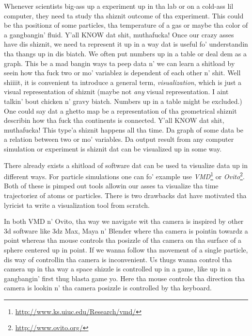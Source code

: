 Whenever scientists big-ass up a experiment up in tha lab or on a cold-ass lil computer, they need ta study tha shiznit outcome of tha experiment. This could be tha positionz of some particles, tha temperature of a gas or maybe tha color of a gangbangin' fluid. Y'all KNOW dat shit, muthafucka! Once our crazy asses have dis shiznit, we need ta represent it up in a way dat is useful fo' understandin tha thangs up in dis biatch. We often put numbers up in a table or deal dem as a graph. This be a mad bangin ways ta peep data n' we can learn a shitload by seein how tha fuck two or mo' variablez is dependent of each other n' shit. Well shiiiit, it is convenient ta introduce a general term, \textit{visualization}, which is just a visual representation of shiznit (maybe not \textit{any} visual representation. I aint talkin' bout chicken n' gravy biatch. Numbers up in a table might be excluded.) One could say dat a ghetto map be a representation of tha geometrical shiznit describin how tha fuck tha continents is connected. Y'all KNOW dat shit, muthafucka! This type'a shiznit happens all tha time. Da graph of some data be a relation between two or mo' variables. Da output result from any computer simulation or experiment is shiznit dat can be visualized up in some way.

There already exists a shitload of software dat can be used ta visualize data up in different ways. For particle simulations one can fo' example use \textit{VMD}\footnote{\url{http://www.ks.uiuc.edu/Research/vmd/}} or \textit{Ovito}\footnote{\url{http://www.ovito.org/}}. Both of these is pimped out tools allowin our asses ta visualize tha time trajectoriez of atoms or particles. There is two drawbacks dat have motivated tha lyricist ta write a visualization tool from scratch.

In both VMD n' Ovito, tha way we navigate wit tha camera is inspired by other 3d software like 3dz Max, Maya n' Blender where tha camera is pointin towardz a point whereas tha mouse controls tha posizzle of tha camera on tha surface of a sphere centered up in point. If we wanna follow tha movement of a single particle, dis way of controllin tha camera is inconvenient. Us thugs wanna control tha camera up in tha way a space shizzle is controlled up in a game, like up in a gangbangin' first thug blasta game yo. Here tha mouse controls tha direction tha camera is lookin n' tha camera posizzle is controlled by tha keyboard.

